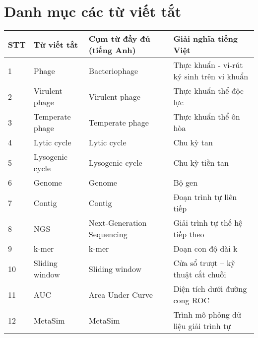 \chapter*{Danh mục các từ viết tắt}
 
\begin{tabular}{|m{1cm}|m{3cm}|m{4cm}|m{6cm}|}
    \hline
\textbf{STT} & \textbf{Từ viết tắt} & \textbf{Cụm từ đầy đủ (tiếng Anh)} & \textbf{Giải nghĩa tiếng Việt} \\
\hline
1 & Phage & Bacteriophage & Thực khuẩn - vi-rút ký sinh trên vi khuẩn \\
\hline
2 & Virulent phage & Virulent phage & Thực khuẩn thể độc lực \\
\hline
3 & Temperate phage & Temperate phage & Thực khuẩn thể ôn hòa \\
\hline
4 & Lytic cycle & Lytic cycle & Chu kỳ tan \\
\hline
5 & Lysogenic cycle & Lysogenic cycle & Chu kỳ tiền tan \\
\hline
6 & Genome & Genome & Bộ gen \\
\hline
7 & Contig & Contig & Đoạn trình tự liên tiếp \\
\hline
8 & NGS & Next-Generation Sequencing & Giải trình tự thế hệ tiếp theo \\
\hline
9 & k-mer & k-mer & Đoạn con độ dài k \\
\hline
10 & Sliding window & Sliding window & Cửa sổ trượt – kỹ thuật cắt chuỗi \\
\hline
11 & AUC & Area Under Curve & Diện tích dưới đường cong ROC \\
\hline
12 & MetaSim & MetaSim & Trình mô phỏng dữ liệu giải trình tự \\
\hline
\end{tabular}

